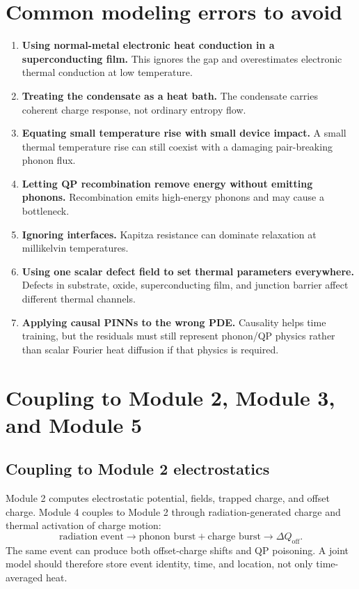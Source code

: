 \documentclass[11pt]{article}
\begin{document}
\section{Common modeling errors to avoid}

\begin{enumerate}[label=\arabic*.]
\item \textbf{Using normal-metal electronic heat conduction in a superconducting film.} This ignores the gap and overestimates electronic thermal conduction at low temperature.
\item \textbf{Treating the condensate as a heat bath.} The condensate carries coherent charge response, not ordinary entropy flow.
\item \textbf{Equating small temperature rise with small device impact.} A small thermal temperature rise can still coexist with a damaging pair-breaking phonon flux.
\item \textbf{Letting QP recombination remove energy without emitting phonons.} Recombination emits high-energy phonons and may cause a bottleneck.
\item \textbf{Ignoring interfaces.} Kapitza resistance can dominate relaxation at millikelvin temperatures.
\item \textbf{Using one scalar defect field to set thermal parameters everywhere.} Defects in substrate, oxide, superconducting film, and junction barrier affect different thermal channels.
\item \textbf{Applying causal PINNs to the wrong PDE.} Causality helps time training, but the residuals must still represent phonon/QP physics rather than scalar Fourier heat diffusion if that physics is required.
\end{enumerate}

\section{Coupling to Module 2, Module 3, and Module 5}

\subsection{Coupling to Module 2 electrostatics}

Module 2 computes electrostatic potential, fields, trapped charge, and offset charge. Module 4 couples to Module 2 through radiation-generated charge and thermal activation of charge motion:
\begin{equation}
\text{radiation event}\rightarrow \text{phonon burst} + \text{charge burst} \rightarrow \Delta Q_{\mathrm{off}}.
\end{equation}
The same event can produce both offset-charge shifts and QP poisoning. A joint model should therefore store event identity, time, and location, not only time-averaged heat.
\end{document}
